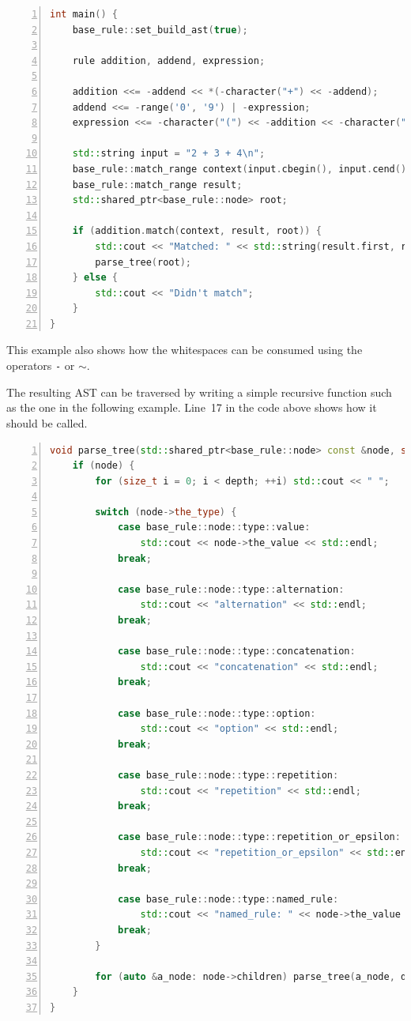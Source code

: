 \documentclass[12pt]{article}
\begin{document}
\begin{center}
	\begin{minipage}[h]{0.85\textwidth}
		\begin{lstlisting}[language=C++, breaklines=true, numbers=left]
int main() {
	base_rule::set_build_ast(true);

	rule addition, addend, expression;

	addition <<= -addend << *(-character("+") << -addend);
	addend <<= -range('0', '9') | -expression;
	expression <<= -character("(") << -addition << -character(")");

	std::string input = "2 + 3 + 4\n";
	base_rule::match_range context(input.cbegin(), input.cend());
	base_rule::match_range result;
	std::shared_ptr<base_rule::node> root;

	if (addition.match(context, result, root)) {
		std::cout << "Matched: " << std::string(result.first, result.second);
		parse_tree(root);
	} else {
		std::cout << "Didn't match";
	}
}
		\end{lstlisting}
	\end{minipage}
\end{center}

This example also shows how the whitespaces can be consumed using the operators \texttt{-} or \texttt{$\sim$}.

The resulting AST can be traversed by writing a simple recursive function such as the one in the following
example. Line~17 in the code above shows how it should be called.

\begin{center}
	\begin{minipage}[h]{0.95\textwidth}
		\begin{lstlisting}[language=C++, breaklines=true, numbers=left]
void parse_tree(std::shared_ptr<base_rule::node> const &node, size_t depth=0) {
	if (node) {
		for (size_t i = 0; i < depth; ++i) std::cout << " ";

		switch (node->the_type) {
			case base_rule::node::type::value:
				std::cout << node->the_value << std::endl;
			break;

			case base_rule::node::type::alternation:
				std::cout << "alternation" << std::endl;
			break;

			case base_rule::node::type::concatenation:
				std::cout << "concatenation" << std::endl;
			break;

			case base_rule::node::type::option:
				std::cout << "option" << std::endl;
			break;

			case base_rule::node::type::repetition:
				std::cout << "repetition" << std::endl;
			break;

			case base_rule::node::type::repetition_or_epsilon:
				std::cout << "repetition_or_epsilon" << std::endl;
			break;

			case base_rule::node::type::named_rule:
				std::cout << "named_rule: " << node->the_value << std::endl;
			break;
		}

		for (auto &a_node: node->children) parse_tree(a_node, depth + 1);
	}
}
		\end{lstlisting}
	\end{minipage}
\end{center}
\end{document}
